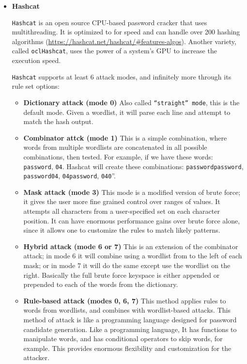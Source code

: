 \begin{itemize}
  \item \textbf{Hashcat}
  \smallskip

  \verb|Hashcat| is an open source CPU-based password cracker that uses multithreading. It is optimized to for speed and can handle over 200 hashing algorithms (\url{https://hashcat.net/hashcat/#features-algos}). Another variety, called \verb|oclHashcat|, uses the power of a system's GPU to increase the execution speed.

  \verb|Hashcat| supports at least 6 attack modes, and infinitely more through its rule set options:

  \begin{itemize}
    \item \textbf{Dictionary attack (mode 0)}
    Also called \verb|“straight” mode|, this is the default mode. Given a wordlist, it will parse each line and attempt to match the hash output.

    \item \textbf{Combinator attck (mode 1)}
    This is a simple combination, where words from multiple wordlists are concatenated in all possible combinations, then tested. For example, if we have these words: \verb|password|, \verb|04|. Hashcat will create these combinations: \verb|passwordpassword|, \verb|password04|, \verb|04password|, \verb|040|”.

    \item \textbf{Mask attack (mode 3)}
    This mode is a modified version of brute force; it gives the user more fine grained control over ranges of values. It attempts all characters from a user-specified set on each character position. It can have enormous performance gains over brute force alone, since it allows one to customize the rules to match likely patterns.

    \item \textbf{Hybrid attack (mode 6 or 7)}
    This is an extension of the combinator attack; in mode 6 it will combine using a wordlist from to the left of each mask; or in mode 7 it will do the same except use the wordlist on the right. Basically the full brute force keyspace is either appended or prepended to each of the words from the dictionary.

    \item \textbf{Rule-based attack (modes 0, 6, 7)}
    This method applies rules to words from wordlists, and combines with wordlist-based attacks. This method of attack is like a programming language designed for password candidate generation. Like a programming language, It has functions to manipulate words, and has conditional operators to skip words, for example. This provides enormous flexibility and customization for the attacker.


\end{itemize}
\end{itemize}
